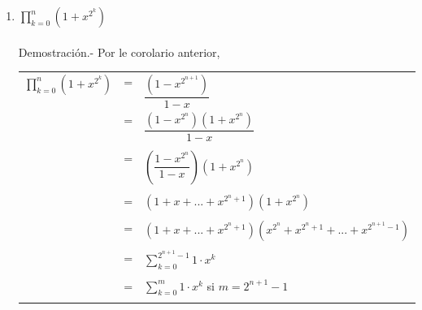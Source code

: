 \begin{enumerate}
\begin{enumerate}[\bfseries (a)]
                \item $\displaystyle\prod_{k=0}^n (1+x^{2^k})$\\\\
                Demostración.- \; Por le corolario anterior,
                    \begin{center}
                        \begin{tabular}{r c l}
                            $\displaystyle\prod_{k=0}^n \left( 1+x^{2^k} \right)$&=&$\dfrac{(1 - x^{2^{n+1}})}{1-x}$\\
                            &=&$\dfrac{(1-x^{2^n})(1+x^{2^n})}{1-x}$\\\\
                            &=&$\left( \dfrac{1 - x^{2^n}}{1-x} \right) (1+x^{2^n})$\\\\
                            &=&$(1+x+...+x^{2^n + 1})(1 + x^{2^n})$\\\\
                            &=&$(1+x+...+x^{2^n + 1})(x^{2^n} + x^{2^n +1} + ... + x^{2^{n+1} - 1})$\\\\
                            &=&$\displaystyle\sum_{k=0}^{2^{n+1} - 1} 1 \cdot x^k$\\\\
                            &=&$\displaystyle\sum_{k=0}^{m} 1 \cdot x^k$ si $m = 2^{n+1} - 1$\\\\
                        \end{tabular}
                    \end{center}

            \end{enumerate}

    \end{enumerate}

